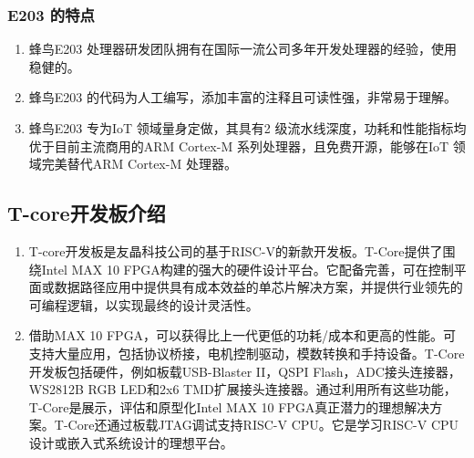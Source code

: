 \documentclass[a4paper, 14pt, oneside]{book} %
\numberwithin{equation}{subsection}
\begin{document}
			\subsubsection{E203 的特点}
				\begin{enumerate}
					\item 
						蜂鸟E203 处理器研发团队拥有在国际一流公司多年开发处理器的经验，使用稳健的。
					\item 
						蜂鸟E203 的代码为人工编写，添加丰富的注释且可读性强，非常易于理解。
					\item 
						蜂鸟E203 专为IoT 领域量身定做，其具有2 级流水线深度，功耗和性能指标均优于目前主流商用的ARM Cortex-M 系列处理器，且免费开源，能够在IoT 领域完美替代ARM Cortex-M 处理器。
				\end{enumerate}	

		\subsection{T-core开发板介绍}
			\begin{enumerate}
				\item 
					T-core开发板是友晶科技公司的基于RISC-V的新款开发板。T-Core提供了围绕Intel MAX 10 FPGA构建的强大的硬件设计平台。它配备完善，可在控制平面或数据路径应用中提供具有成本效益的单芯片解决方案，并提供行业领先的可编程逻辑，以实现最终的设计灵活性。
				\item 
					借助MAX 10 FPGA，可以获得比上一代更低的功耗/成本和更高的性能。可支持大量应用，包括协议桥接，电机控制驱动，模数转换和手持设备。T-Core开发板包括硬件，例如板载USB-Blaster II，QSPI Flash，ADC接头连接器，WS2812B RGB LED和2x6 TMD扩展接头连接器。通过利用所有这些功能，T-Core是展示，评估和原型化Intel MAX 10 FPGA真正潜力的理想解决方案。T-Core还通过板载JTAG调试支持RISC-V CPU。它是学习RISC-V CPU设计或嵌入式系统设计的理想平台。
			\end{enumerate}	
	
\end{document}

